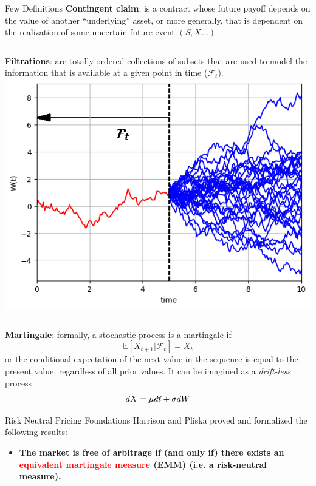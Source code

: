 \documentclass{beamer}
\begin{document}
\begin{frame}{Few Definitions}
		\textbf{Contingent claim}: is a contract whose future payoff depends on the value of another “underlying” asset, or more generally, that is dependent on the realization of some uncertain future event $(S, X\ldots)$
		
		\begin{columns}
			\textbf{Filtrations}: are totally ordered collections of subsets that are used to model the information that is available at a given point in time ($\mathcal{F}_t$). 
				\includegraphics[width=0.8\linewidth]{filtration}
		\end{columns}
		
		\textbf{Martingale}: formally, a stochastic process is a martingale if
\begin{equation*} 
\mathbb{E}[X_{t+1}|\mathcal{F}_t] = X_t
\end{equation*}
or the conditional expectation of the next value in the sequence is equal to the present value, regardless of all prior values. 
It can be imagined as a \emph{drift-less} process
		\begin{equation*}
			dX = \cancel{\mu dt} + \sigma dW
		\end{equation*}
	\end{frame}

	\begin{frame}{Risk Neutral Pricing Foundations}
	Harrison and Pliska proved and formalized the following results:
	\begin{itemize}
		\item \textbf{The market is free of arbitrage if (and only if) there exists an \textcolor{red}{equivalent martingale measure} (EMM) (i.e. a risk-neutral measure).}
	\end{itemize}
	\vfill
	\end{frame}
\end{document}
